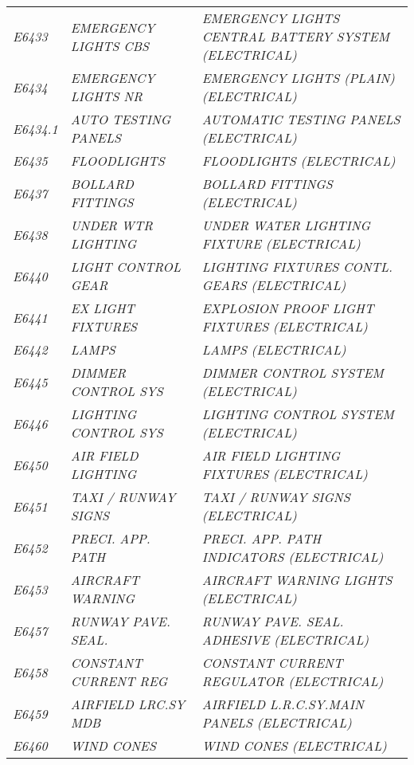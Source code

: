 \begin{landscape}
\begin{longtable}[l]{l%
                  l|%
                  l|}
\itshape E6433       &\itshape EMERGENCY LIGHTS CBS   &\itshape EMERGENCY LIGHTS CENTRAL BATTERY SYSTEM (ELECTRICAL)   \\
\itshape E6434       &\itshape EMERGENCY LIGHTS NR   &\itshape EMERGENCY LIGHTS (PLAIN) (ELECTRICAL)   \\
\itshape E6434.1     &\itshape AUTO TESTING PANELS   &\itshape AUTOMATIC TESTING PANELS (ELECTRICAL)   \\
\itshape E6435       &\itshape FLOODLIGHTS   &\itshape FLOODLIGHTS (ELECTRICAL)   \\
\itshape E6437       &\itshape BOLLARD FITTINGS   &\itshape BOLLARD FITTINGS (ELECTRICAL)   \\
\itshape E6438       &\itshape UNDER WTR LIGHTING   &\itshape UNDER WATER LIGHTING FIXTURE (ELECTRICAL)   \\
\itshape E6440       &\itshape LIGHT CONTROL GEAR   &\itshape LIGHTING FIXTURES CONTL. GEARS (ELECTRICAL)   \\
\itshape E6441       &\itshape EX LIGHT FIXTURES   &\itshape EXPLOSION PROOF LIGHT FIXTURES (ELECTRICAL)   \\
\itshape E6442       &\itshape LAMPS   &\itshape LAMPS (ELECTRICAL)   \\
\itshape E6445       &\itshape DIMMER CONTROL SYS   &\itshape DIMMER CONTROL SYSTEM (ELECTRICAL)   \\
\itshape E6446       &\itshape LIGHTING CONTROL SYS   &\itshape LIGHTING CONTROL SYSTEM (ELECTRICAL)   \\
\itshape E6450       &\itshape AIR FIELD LIGHTING   &\itshape AIR FIELD LIGHTING FIXTURES (ELECTRICAL)   \\
\itshape E6451       &\itshape TAXI / RUNWAY SIGNS   &\itshape TAXI / RUNWAY SIGNS (ELECTRICAL)   \\
\itshape E6452       &\itshape PRECI. APP. PATH   &\itshape PRECI. APP. PATH INDICATORS (ELECTRICAL)   \\
\itshape E6453       &\itshape AIRCRAFT WARNING   &\itshape AIRCRAFT WARNING LIGHTS (ELECTRICAL)   \\
\itshape E6457       &\itshape RUNWAY PAVE. SEAL.   &\itshape RUNWAY PAVE. SEAL. ADHESIVE (ELECTRICAL)   \\
\itshape E6458       &\itshape CONSTANT CURRENT REG   &\itshape CONSTANT CURRENT REGULATOR (ELECTRICAL)   \\
\itshape E6459       &\itshape AIRFIELD LRC.SY MDB   &\itshape AIRFIELD L.R.C.SY.MAIN PANELS (ELECTRICAL)   \\
\itshape E6460       &\itshape WIND CONES   &\itshape WIND CONES (ELECTRICAL)   \\

\end{longtable}
\end{landscape}
